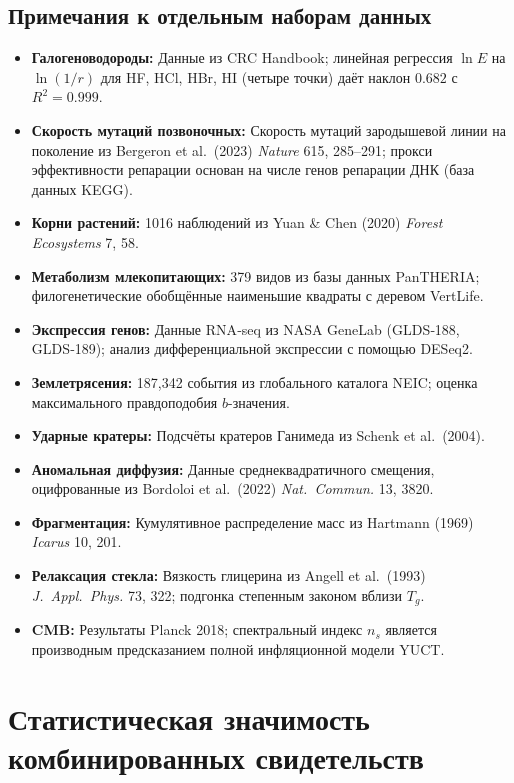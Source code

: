\documentclass[11pt,a4paper]{article}
\begin{document}
	\subsection*{Примечания к отдельным наборам данных}
	\begin{itemize}
		\item \textbf{Галогеноводороды:} Данные из CRC Handbook; линейная регрессия \(\ln E\) на \(\ln(1/r)\) для HF, HCl, HBr, HI (четыре точки) даёт наклон \(0.682\) с \(R^2=0.999\).
		\item \textbf{Скорость мутаций позвоночных:} Скорость мутаций зародышевой линии на поколение из Bergeron et al.\ (2023) \textit{Nature} 615, 285–291; прокси эффективности репарации основан на числе генов репарации ДНК (база данных KEGG).
		\item \textbf{Корни растений:} 1016 наблюдений из Yuan \& Chen (2020) \textit{Forest Ecosystems} 7, 58.
		\item \textbf{Метаболизм млекопитающих:} 379 видов из базы данных PanTHERIA; филогенетические обобщённые наименьшие квадраты с деревом VertLife.
		\item \textbf{Экспрессия генов:} Данные RNA‑seq из NASA GeneLab (GLDS‑188, GLDS‑189); анализ дифференциальной экспрессии с помощью DESeq2.
		\item \textbf{Землетрясения:} 187,342 события из глобального каталога NEIC; оценка максимального правдоподобия \(b\)-значения.
		\item \textbf{Ударные кратеры:} Подсчёты кратеров Ганимеда из Schenk et al.\ (2004).
		\item \textbf{Аномальная диффузия:} Данные среднеквадратичного смещения, оцифрованные из Bordoloi et al.\ (2022) \textit{Nat.\ Commun.} 13, 3820.
		\item \textbf{Фрагментация:} Кумулятивное распределение масс из Hartmann (1969) \textit{Icarus} 10, 201.
		\item \textbf{Релаксация стекла:} Вязкость глицерина из Angell et al.\ (1993) \textit{J.\ Appl.\ Phys.} 73, 322; подгонка степенным законом вблизи \(T_g\).
		\item \textbf{CMB:} Результаты Planck 2018; спектральный индекс \(n_s\) является производным предсказанием полной инфляционной модели YUCT.
	\end{itemize}
	
	\section{Статистическая значимость комбинированных свидетельств}
	
\end{document}

